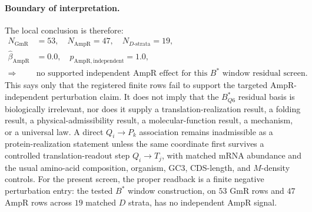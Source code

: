\paragraph{Boundary of interpretation.}
The local conclusion is therefore:
$$
\begin{aligned}
N_{\mathrm{GmR}} &= 53,\quad N_{\mathrm{AmpR}}=47,\quad N_{D\text{-strata}}=19,\\
\widehat\beta_{\mathrm{AmpR}} &= 0.0,\quad p_{\mathrm{AmpR,independent}}=1.0,\\
\Rightarrow\quad &\text{no supported independent AmpR effect for this }B^\ast\text{ window residual screen.}
\end{aligned}
$$
This says only that the registered finite rows fail to support the targeted AmpR-independent perturbation claim.  It does not imply that the $B^\ast_{Q6}$ residual basis is biologically irrelevant, nor does it supply a translation-realization result, a folding result, a physical-admissibility result, a molecular-function result, a mechanism, or a universal law.  A direct $Q_i\to P_k$ association remains inadmissible as a protein-realization statement unless the same coordinate first survives a controlled translation-readout step $Q_i\to T_j$, with matched mRNA abundance and the usual amino-acid composition, organism, GC3, CDS-length, and $M$-density controls.  For the present screen, the proper readback is a finite negative perturbation entry: the tested $B^\ast$ window construction, on $53$ GmR rows and $47$ AmpR rows across $19$ matched $D$ strata, has no independent AmpR signal.
